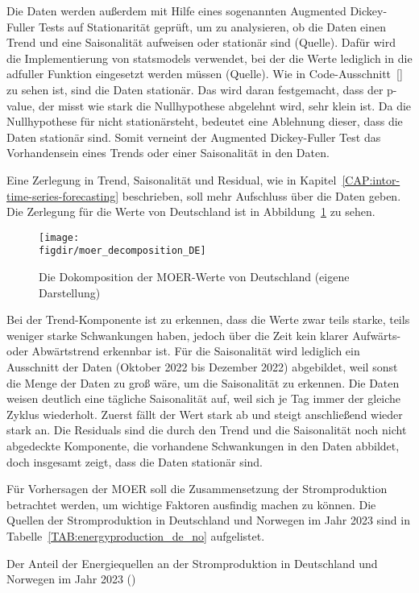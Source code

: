 Die Daten werden außerdem mit Hilfe eines sogenannten Augmented Dickey-Fuller Tests auf Stationarität geprüft, um zu analysieren, ob die Daten einen Trend und eine Saisonalität aufweisen oder stationär sind (Quelle).
Dafür wird die Implementierung von statsmodels verwendet, bei der die Werte lediglich in die adfuller Funktion eingesetzt werden müssen (Quelle).
Wie in Code-Ausschnitt~\ref{} zu sehen ist, sind die Daten stationär.
Das wird daran festgemacht, dass der p-value, der misst wie stark die Nullhypothese abgelehnt wird, sehr klein ist.
Da die Nullhypothese für \glqq nicht stationär\grqq steht, bedeutet eine Ablehnung dieser, dass die Daten stationär sind.
Somit verneint der Augmented Dickey-Fuller Test das Vorhandensein eines Trends oder einer Saisonalität in den Daten.

Eine Zerlegung in Trend, Saisonalität und Residual, wie in Kapitel~\ref{CAP:intor-time-series-forecasting} beschrieben, soll mehr Aufschluss über die Daten geben.
Die Zerlegung für die Werte von Deutschland ist in Abbildung~\ref{FIG:moer_decomposition_DE} zu sehen.
\begin{figure}
 \caption{Die Dokomposition der MOER-Werte von Deutschland (eigene Darstellung)}
 {\texttt{[image: \\figdir/moer\_decomposition\_DE]}}
 \label{FIG:moer_decomposition_DE}
\end{figure}
Bei der Trend-Komponente ist zu erkennen, dass die Werte zwar teils starke, teils weniger starke Schwankungen haben, jedoch über die Zeit kein klarer Aufwärts- oder Abwärtstrend erkennbar ist.
Für die Saisonalität wird lediglich ein Ausschnitt der Daten (Oktober 2022 bis Dezember 2022) abgebildet, weil sonst die Menge der Daten zu groß wäre, um die Saisonalität zu erkennen.
Die Daten weisen deutlich eine tägliche Saisonalität auf, weil sich je Tag immer der gleiche Zyklus wiederholt.
Zuerst fällt der Wert stark ab und steigt anschließend wieder stark an.
Die Residuals sind die durch den Trend und die Saisonalität noch nicht abgedeckte Komponente, die vorhandene Schwankungen in den Daten abbildet, doch insgesamt zeigt, dass die Daten stationär sind.

Für Vorhersagen der \ac{MOER} soll die Zusammensetzung der Stromproduktion betrachtet werden, um wichtige Faktoren ausfindig machen zu können.
Die Quellen der Stromproduktion in Deutschland und Norwegen im Jahr 2023 sind in Tabelle~\ref{TAB:energyproduction_de_no} aufgelistet.
\begin{table}[t]
 \centering\small
 \caption{Der Anteil der Energiequellen an der Stromproduktion in Deutschland und Norwegen im Jahr 2023 (\cite{ElectricityMaps.20240305T20:54:29.000Z})}
 \label{TAB:energyproduction_de_no}
 
\end{table}

